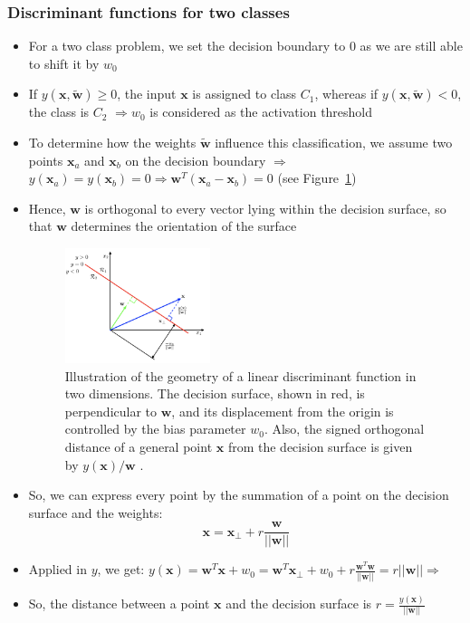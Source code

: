 \subsubsection{Discriminant functions for two classes}
\begin{itemize}
	\item For a two class problem, we set the decision boundary to 0 as we are still able to shift it by $w_0$
	\item If $y\left(\bm{x},\bm{\tilde{w}}\right)\geq 0$, the input $\bm{x}$ is assigned to class $C_1$, whereas if $y\left(\bm{x},\bm{\tilde{w}}\right)< 0$, the class is $C_2$ $\Rightarrow w_0$ is considered as the activation threshold
	\item To determine how the weights $\bm{\tilde{w}}$ influence this classification, we assume two points $\bm{x}_a$ and $\bm{x}_b$ on the decision boundary $\Rightarrow$ $y\left(\bm{x}_a\right) = y\left(\bm{x}_b\right) = 0 \Rightarrow \bm{w}^T(\bm{x}_a - \bm{x}_b) = 0$ (see Figure~\ref{img:discriminant_function_two_classes})
	\item Hence, $\bm{w}$ is orthogonal to every vector lying within the decision surface, so that $\bm{w}$ determines the orientation of the surface
	\begin{figure}[ht]
		\centering
		\includegraphics[width=0.4\textwidth]{figures/discriminant_function_two_classes.png}
		\caption{Illustration of the geometry of a linear discriminant function in two dimensions. The decision surface, shown in red, is perpendicular to $\bm{w}$, and its displacement from the origin is controlled by the bias parameter $w_0$. Also, the signed orthogonal distance of a general point $\bm{x}$ from the decision surface is given by $y(\bm{x})/ \bm{w}$ .}
		\label{img:discriminant_function_two_classes}
	\end{figure}
	\item So, we can express every point by the summation of a point on the decision surface and the weights: $$\bm{x} = \bm{x}_{\perp} + r\frac{\bm{w}}{||\bm{w}||}$$
	\item Applied in $y$, we get: $y\left(\bm{x}\right) = \bm{w}^T \bm{x} + w_0 = \bm{w}^T \bm{x}_{\perp} + w_0 + r\frac{\bm{w}^T\bm{w}}{||\bm{w}||} = r ||\bm{w}|| \Rightarrow $
	\item So, the distance between a point $\bm{x}$ and the decision surface is $r = \frac{y\left(\bm{x}\right)}{||\bm{w}||}$
\end{itemize}
